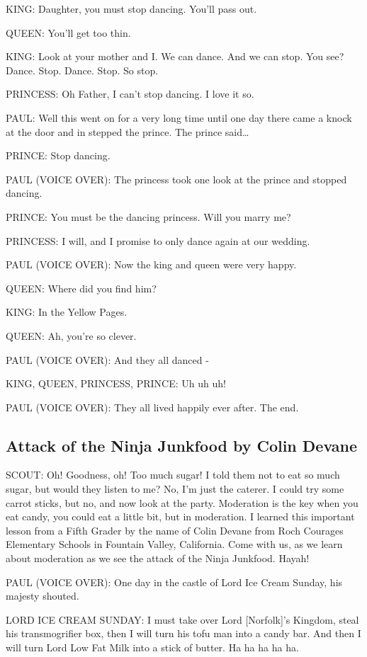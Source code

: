 KING:
Daughter, you must stop dancing.
You'll pass out.

QUEEN:
You'll get too thin.

KING:
Look at your mother and I.
We can dance.
And we can stop.
You see?
Dance. Stop. Dance. Stop.
So stop.

PRINCESS:
Oh Father, I can't stop dancing.
I love it so.

PAUL:
Well this went on for a very long time until one day there came a knock at the door and in stepped the prince.
The prince said\dots

PRINCE:
Stop dancing.

PAUL (VOICE OVER):
The princess took one look at the prince and stopped dancing.

PRINCE:
You must be the dancing princess.
Will you marry me?

PRINCESS:
I will, and I promise to only dance again at our wedding.

PAUL (VOICE OVER):
Now the king and queen were very happy.

QUEEN:
Where did you find him?

KING:
In the Yellow Pages.

QUEEN:
Ah, you're so clever.

PAUL (VOICE OVER):
And they all danced -

KING, QUEEN, PRINCESS, PRINCE:
Uh uh uh!

PAUL (VOICE OVER):
They all lived happily ever after.
The end.

\subsection{Attack of the Ninja Junkfood by Colin Devane}

SCOUT:
Oh! Goodness, oh!
Too much sugar!
I told them not to eat so much sugar, but would they listen to me?
No, I'm just the caterer.
I could try some carrot sticks, but no, and now look at the party.
Moderation is the key when you eat candy, you could eat a little bit, but in moderation.
I learned this important lesson from a Fifth Grader by the name of Colin Devane from Roch Courages Elementary Schools in Fountain Valley, California.
Come with us, as we learn about moderation as we see the attack of the Ninja Junkfood.
Hayah!

PAUL (VOICE OVER):
One day in the castle of Lord Ice Cream Sunday, his majesty shouted.

LORD ICE CREAM SUNDAY:
I must take over Lord [Norfolk]'s Kingdom, steal his transmogrifier box, then I will turn his tofu man into a candy bar.
And then I will turn Lord Low Fat Milk into a stick of butter.
Ha ha ha ha ha.

